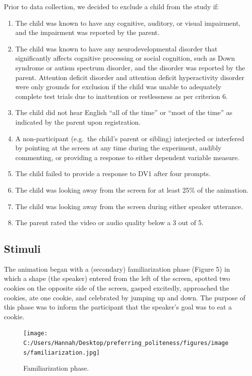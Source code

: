 \documentclass[
  english,
  man,floatsintext]{apa6}
\begin{document}
Prior to data collection, we decided to exclude a child from the study if:

\begin{enumerate}
\def\labelenumi{\arabic{enumi}.}
\item
  The child was known to have any cognitive, auditory, or visual impairment, and the impairment was reported by the parent.
\item
  The child was known to have any neurodevelopmental disorder that significantly affects cognitive processing or social cognition, such as Down syndrome or autism spectrum disorder, and the disorder was reported by the parent. Attention deficit disorder and attention deficit hyperactivity disorder were only grounds for exclusion if the child was unable to adequately complete test trials due to inattention or restlessness as per criterion 6.
\item
  The child did not hear English ``all of the time'' or ``most of the time'' as indicated by the parent upon registration.
\item
  A non-participant (e.g.~the child's parent or sibling) interjected or interfered by pointing at the screen at any time during the experiment, audibly commenting, or providing a response to either dependent variable measure.
\item
  The child failed to provide a response to DV1 after four prompts.
\item
  The child was looking away from the screen for at least 25\% of the animation.
\item
  The child was looking away from the screen during either speaker utterance.
\item
  The parent rated the video or audio quality below a 3 out of 5.
\end{enumerate}

\hypertarget{stimuli}{%
\subsection{Stimuli}\label{stimuli}}

The animation began with a (secondary) familiarization phase (Figure 5) in which a shape (the speaker) entered from the left of the screen, spotted two cookies on the opposite side of the screen, gasped excitedly, approached the cookies, ate one cookie, and celebrated by jumping up and down. The purpose of this phase was to inform the participant that the speaker's goal was to eat a cookie.

\begin{figure}
\centering
\texttt{[image: C:/Users/Hannah/Desktop/preferring\_politeness/figures/images/familiarization.jpg]}
\caption{Familiarization phase.}
\end{figure}
\end{document}
